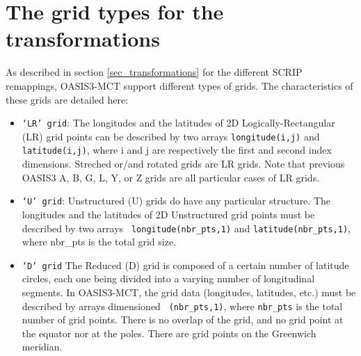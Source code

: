 \newpage
\appendix
\chapter{The grid types for the transformations}
\label{subsec_gridtypes}

As described in section \ref{sec_transformations} for the different
SCRIP remappings, OASIS3-MCT support different types of grids. The
characteristics of these grids are detailed here:

\begin{itemize}

\item {\tt `LR' grid}: The longitudes and the latitudes of
  2D Logically-Rectangular (LR) grid points can be described by two arrays
  {\tt longitude(i,j)} and {\tt latitude(i,j)}, where i and j
  are respectively the first and second index dimensions. Streched
  or/and rotated grids are LR grids. Note that previous OASIS3 A, B, G, L, Y, or Z
  grids are all particular cases of LR grids.

\item {\tt `U' grid}: Unstructured (U) grids do have any particular
      structure. The longitudes and the latitudes of 2D Unstructured
      grid points must be described by two arrays {\tt
      longitude(nbr\_pts,1)} and {\tt latitude(nbr\_pts,1)}, where nbr\_pts
      is the total grid size.

\item {\tt `D' grid} The Reduced (D) grid is composed of a certain
number of latitude circles, each one being divided into a varying
number of longitudinal segments. In OASIS3-MCT, the grid data (longitudes,
latitudes, etc.) must be described by arrays dimensioned {\tt
(nbr\_pts,1)}, where {\tt nbr\_pts} is the total number of grid
points. There is no overlap of the grid, and no grid point at the
equator nor at the poles. There are grid points on the Greenwich
meridian.
 
\end{itemize}



